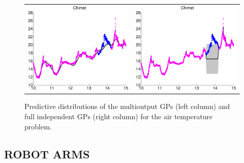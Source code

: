 \begin{figure}
\begin{tabular}{cc}
\includegraphics[scale=0.3]{figures/slfm-weatherChimet.eps} &
\includegraphics[scale=0.3]{figures/weatherChimet.eps}
\end{tabular}
\caption{Predictive distributions of the multioutput GPs (left column) and full independent GPs (right column) for the air temperature problem.}
\label{fig:weather}
\end{figure}

\subsection{ROBOT ARMS}

